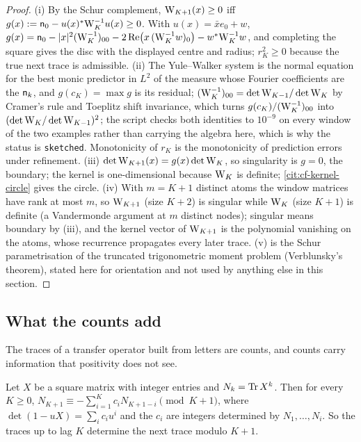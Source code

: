 \begin{proof}
(i) By the Schur complement, $\mathrm{W}_{K+1}(x)\ge0$ iff
$g(x) := \mathsf n_{0} - u(x)^*\mathrm{W}_K^{-1}u(x)\ge0$. With $u(x) = \bar xe_0 + w$,
$g(x) = \mathsf n_{0} - |x|^2(\mathrm{W}_K^{-1})_{00} - 2\,\mathrm{Re}\big(x\,(\mathrm{W}_K^{-1}w)_0\big)
- w^*\mathrm{W}_K^{-1}w$, and completing the square gives the disc with the displayed centre and
radius; $r_K^2\ge0$ because the true next trace is admissible. (ii) The Yule--Walker system is the
normal equation for the best monic predictor in $L^2$ of the measure whose Fourier coefficients
are the $\mathsf n_{k}$, and $g(c_K) = \max g$ is its residual; $(\mathrm{W}_K^{-1})_{00} =
\det\mathrm{W}_{K-1}/\det\mathrm{W}_K$ by Cramer's rule and Toeplitz shift invariance, which turns
$g(c_K)/(\mathrm{W}_K^{-1})_{00}$ into $(\det\mathrm{W}_K/\det\mathrm{W}_{K-1})^2$; the script checks both
identities to $10^{-9}$ on every window of the two examples rather than carrying the algebra
here, which is why the status is \texttt{sketched}. Monotonicity of $r_K$ is the monotonicity of
prediction errors under refinement. (iii) $\det\mathrm{W}_{K+1}(x) = g(x)\det\mathrm{W}_K$, so
singularity is $g = 0$, the boundary; the kernel is one-dimensional because $\mathrm{W}_K$ is
definite; \cref{cit:cf-kernel-circle} gives the circle. (iv) With $m = K+1$ distinct atoms the
window matrices have rank at most $m$, so $\mathrm{W}_{K+1}$ (size $K+2$) is singular while
$\mathrm{W}_K$ (size $K+1$) is definite (a Vandermonde argument at $m$ distinct nodes); singular
means boundary by (iii), and the kernel vector of $\mathrm{W}_{K+1}$ is the polynomial vanishing on
the atoms, whose recurrence propagates every later trace. (v) is the Schur parametrisation of the
truncated trigonometric moment problem (Verblunsky's theorem), stated here for orientation and
not used by anything else in this section.
\end{proof}

\subsection{What the counts add}

The traces of a transfer operator built from letters are counts, and counts carry information
that positivity does not see.

\begin{proposition}
\label{prop:newton-congruence}
Let $X$ be a square matrix with integer entries and $N_k = \operatorname{Tr} X^k$. Then for every $K\ge0$,
$N_{K+1}\equiv -\sum_{i=1}^{K}c_iN_{K+1-i}\pmod{K+1}$, where $\det(1-uX) = \sum_ic_iu^i$ and the
$c_i$ are integers determined by $N_1,\dots,N_i$. So the traces up to lag $K$ determine the next
trace modulo $K+1$.
\end{proposition}

